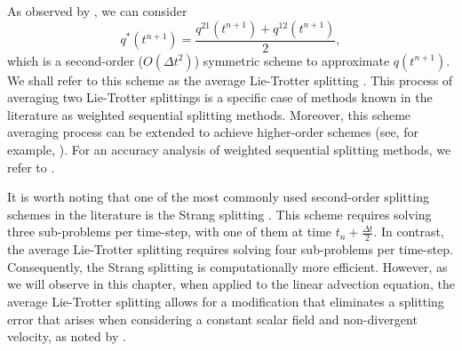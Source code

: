 As observed by \citet{strang:1968}, we can consider
\begin{equation}
	q^*(t^{n+1}) = \frac{q^{21}(t^{n+1}) + q^{12}(t^{n+1})}{2},
\end{equation}
which is a second-order ($O(\Delta t^2)$) symmetric scheme to approximate $q(t^{n+1})$. 
We shall refer to this scheme as the average Lie-Trotter splitting \citep{holden:2010}.
This process of averaging two Lie-Trotter splittings is a specific case of methods known 
in the literature as weighted sequential splitting methods.
Moreover, this scheme averaging process can be extended to achieve higher-order schemes
(see, for example, \citet{jia:2011}).
For an accuracy analysis of weighted sequential splitting methods, we refer to \citet{csomos:2005}.

It is worth noting that one of the most commonly used second-order splitting schemes in the literature is the Strang splitting \citep{strang:1968}.
This scheme requires solving three sub-problems per time-step, with one of them at time $t_n + \frac{\Delta t}{2}$.
In contrast, the average Lie-Trotter splitting requires solving four sub-problems per time-step.
Consequently, the Strang splitting is computationally more efficient.
However, as we will observe in this chapter, when applied to the linear advection equation,
the average Lie-Trotter splitting allows for a modification that eliminates a splitting error
that arises when considering a constant scalar field and non-divergent velocity, as noted by \citet{lin:1996}.

